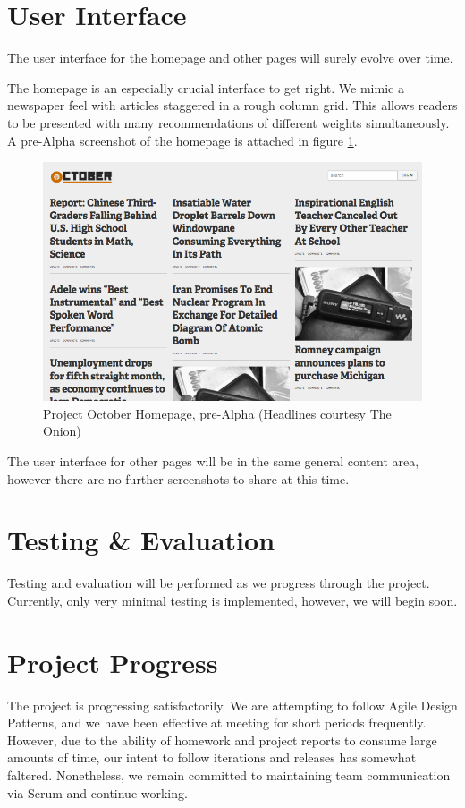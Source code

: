 \documentclass[11pt,letterpaper]{article}
\begin{document}
\section{User Interface}
The user interface for the homepage and other pages will surely evolve over time.

The homepage is an especially crucial interface to get right. We mimic a newspaper feel with articles staggered in a rough column grid.
This allows readers to be presented with many recommendations of different weights simultaneously.
A pre-Alpha screenshot of the homepage is attached in figure \ref{fig:homepage}.

\begin{figure}
\centering
\includegraphics[scale=0.35]{img/homepage.png}
\caption{Project October Homepage, pre-Alpha (Headlines courtesy The Onion)}
\label{fig:homepage}
\end{figure}

The user interface for other pages will be in the same general content area, however there are no further screenshots to share at this time.

\section{Testing \& Evaluation}
Testing and evaluation will be performed as we progress through the project. Currently, only very minimal testing is implemented, however, we will begin soon.

\section{Project Progress}
The project is progressing satisfactorily.
We are attempting to follow Agile Design Patterns, and we have been effective at meeting for short periods frequently.
However, due to the ability of homework and project reports to consume large amounts of time, our intent to follow iterations and releases has somewhat faltered.
Nonetheless, we remain committed to maintaining team communication via Scrum and continue working.
\end{document}
